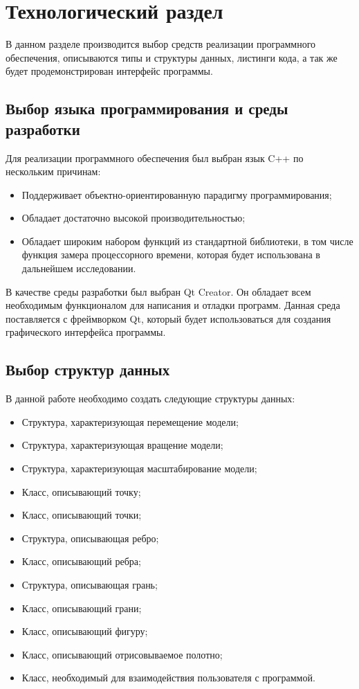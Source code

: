 \chapter{Технологический раздел}
В данном разделе производится выбор средств реализации программного обеспечения, описываются типы и структуры данных, листинги кода, а так же будет продемонстрирован интерфейс программы.

\section{Выбор языка программирования и среды разработки}

Для реализации программного обеспечения был выбран язык C++ по нескольким причинам:
\begin{itemize}
	\item Поддерживает объектно-ориентированную парадигму программирования;
	\item Обладает достаточно высокой производительностью;
	\item Обладает широким набором функций из стандартной библиотеки, в том числе функция замера процессорного времени, которая будет использована в дальнейшем исследовании.
\end{itemize}

В качестве среды разработки был выбран Qt Creator. Он обладает всем необходимым функционалом для написания и отладки программ. Данная среда поставляется с фреймворком Qt, который будет использоваться для создания графического интерфейса программы.


\section{Выбор структур данных}
В данной работе необходимо создать следующие структуры данных:

\begin{itemize}
	\item Структура, характеризующая перемещение модели;
	\item Структура, характеризующая вращение модели;
	\item Структура, характеризующая масштабирование модели;
	\item Класс, описывающий точку;
	\item Класс, описывающий точки;
	\item Структура, описывающая ребро;
	\item Класс, описывающий ребра;
	\item Структура, описывающая грань;
	\item Класс, описывающий грани;
	\item Класс, описывающий фигуру;
	\item Класс, описывающий отрисовываемое полотно;
	\item Класс, необходимый для взаимодействия пользователя с программой.
\end{itemize}


